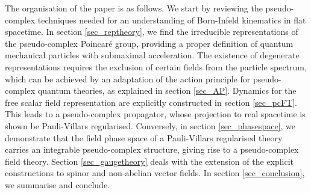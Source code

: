 \documentclass[a4paper,aps,prd,showkeys,showpacs,superscriptaddress,preprint]{revtex4}
\begin{document}
The organisation of the paper is as follows. We start by reviewing the
pseudo-complex techniques needed for an understanding of Born-Infeld
kinematics in flat spacetime. In section \ref{sec_reptheory}, we find
the irreducible representations of the
pseudo-complex Poincar\'e group, providing a proper definition of
quantum mechanical particles with submaximal
acceleration. The existence of degenerate representations requires the
exclusion of certain fields from the particle spectrum,
which can be achieved by an adaptation of the action principle for
pseudo-complex quantum theories, as explained in section \ref{sec_AP}. 
Dynamics for
the free scalar field representation are explicitly constructed in section
\ref{sec_pcFT}. This leads to a 
pseudo-complex propagator, whose projection to real spacetime is shown
be Pauli-Villars regularised. 
Conversely, in section \ref{sec_phasespace}, we demonstrate that the
field phase space of a Pauli-Villars regularised theory
carries an integrable 
pseudo-complex structure, giving rise to a pseudo-complex field theory.
Section \ref{sec_gaugetheory} deals with the extension of the explicit
constructions to spinor and non-abelian vector fields. In section
\ref{sec_conclusion}, we summarise and conclude.
\end{document}
